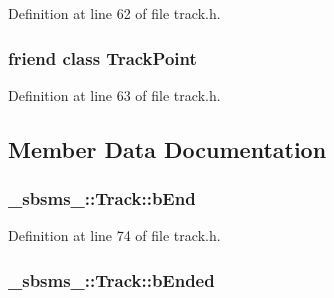 Definition at line 62 of file track.\+h.

\subsubsection[{\texorpdfstring{Track\+Point}{TrackPoint}}]{\setlength{\rightskip}{0pt plus 5cm}friend class {\bf Track\+Point}\hspace{0.3cm}{\ttfamily [friend]}}\hypertarget{class__sbsms___1_1_track_a039c7f5cbb0f81187fc02dc0eb82a910}{}\label{class__sbsms___1_1_track_a039c7f5cbb0f81187fc02dc0eb82a910}


Definition at line 63 of file track.\+h.



\subsection{Member Data Documentation}
\subsubsection[{\texorpdfstring{b\+End}{bEnd}}]{ \+\_\+sbsms\+\_\+\+::\+Track\+::b\+End\hspace{0.3cm}{\ttfamily [protected]}}\hypertarget{class__sbsms___1_1_track_ab28b8a158bc9f59e7372465be564b0e1}{}\label{class__sbsms___1_1_track_ab28b8a158bc9f59e7372465be564b0e1}


Definition at line 74 of file track.\+h.

\subsubsection[{\texorpdfstring{b\+Ended}{bEnded}}]{ \+\_\+sbsms\+\_\+\+::\+Track\+::b\+Ended\hspace{0.3cm}{\ttfamily [protected]}}\hypertarget{class__sbsms___1_1_track_ae8d665c8b3044b27980572c57d54cb18}{}\label{class__sbsms___1_1_track_ae8d665c8b3044b27980572c57d54cb18}


